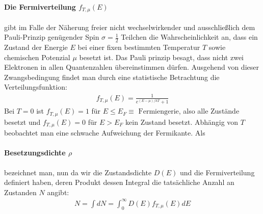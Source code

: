 \documentclass[twoside,        %
               BCOR12mm,       %
               english,ngerman, %
               fleqn,headsepline=false,footsepline=false
              ]{MFPREPORT}
\begin{document}
\paragraph{Die Fermiverteilung $f_{T,\mu}(E)$} gibt im Falle der Näherung freier nicht wechselwirkender und ausschließlich dem Pauli-Prinzip genügender Spin $\sigma = \frac{1}{2}$ Teilchen die Wahrscheinlichkeit an, dass ein Zustand der Energie $E$ bei einer fixen bestimmten Temperatur $T$ sowie chemischen Potenzial $\mu$ besetzt ist. 
Das Pauli prinzip besagt, dass nicht zwei Elektronen in allen Quantenzahlen übereinstimmen dürfen. Ausgehend von dieser Zwangsbedingung findet man durch eine statistische Betrachtung die Verteilungsfunktion:
\begin{align}
f_{T, \mu} (E)={\frac {1}{e^{(E-\mu )/kT}+1}}
\end{align}
Bei $T=0$ ist $f_{T,\mu}(E)=1$ für $E \leq E_{F} \equiv \text{ Fermiengerie}$, also alle Zustände besetzt und $f_{T,\mu}(E)=0$ für $E > E_{F} $ kein Zustand besetzt. 
Abhängig von $T$ beobachtet man eine schwache Aufweichung der Fermikante. 
Als \paragraph{Besetzungsdichte $\rho$} bezeichnet man, nun da wir die Zustandsdichte $D(E)$ und die Fermiverteilung definiert haben, deren Produkt dessen Integral die tatsächliche Anzahl an Zustanden $N$ angibt:
\begin{align}
N = \int dN = \int_{0}^{\infty} D(E) f_{T,\mu} (E) dE
\end{align}
 
\end{document}
